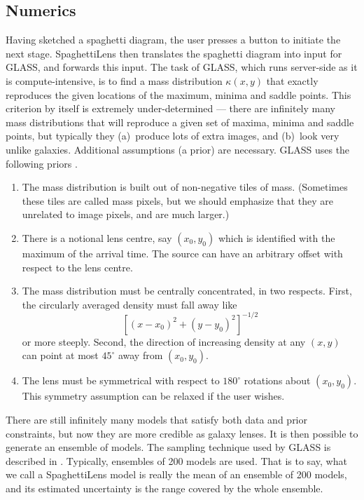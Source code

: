 \documentclass[usenatbib]{mn2e}
\newcommand{\spl}{SpaghettiLens\xspace}
\begin{document}

\subsection{Numerics}

Having sketched a spaghetti diagram, the user presses a button to
initiate the next stage.  \spl then translates the spaghetti diagram
into input for GLASS, and forwards this input.  The task of GLASS,
which runs server-side as it is compute-intensive, is to find a mass
distribution $\kappa(x,y)$ that exactly reproduces the given locations
of the maximum, minima and saddle points. This criterion by itself is
extremely under-determined --- there are infinitely many mass
distributions that will reproduce a given set of maxima, minima and
saddle points, but typically they (a)~produce lots of extra images,
and (b)~look very unlike galaxies.  Additional assumptions (a prior)
are necessary.  GLASS uses the following priors
\citep[cf.][]{1997MNRAS.292..148S,2008ApJ...679...17C}.
\begin{enumerate}
\item The mass distribution is built out of non-negative tiles of
  mass.  (Sometimes these tiles are called mass pixels, but we should
  emphasize that they are unrelated to image pixels, and are much
  larger.)
\item There is a notional lens centre, say $(x_0,y_0)$ which is
  identified with the maximum of the arrival time.  The source can
  have an arbitrary offset with respect to the lens centre.
\item The mass distribution must be centrally concentrated, in two
  respects.  First, the circularly averaged density must fall away
  like $$ \left[(x-x_0)^2+(y-y_0)^2\right]^{-1/2}$$ or more steeply.
  Second, the direction of increasing density at any $(x,y)$ can point
  at most $45^\circ$ away from $(x_0,y_0)$.
\item The lens must be symmetrical with respect to $180^\circ$ rotations
  about $(x_0,y_0)$.  This symmetry assumption can be relaxed if the
  user wishes.
\end{enumerate}
There are still infinitely many models that satisfy both data and
prior constraints, but now they are more credible as galaxy lenses.
It is then possible to generate an ensemble of models.  The sampling
technique used by GLASS is described in \citep{Lubini2012}.
Typically, ensembles of 200 models are used.  That is to say, what we
call a \spl model is really the mean of an ensemble of 200 models, and
its estimated uncertainty is the range covered by the whole ensemble.
\end{document}

